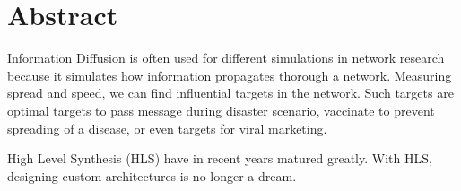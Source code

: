 \section*{Abstract}


Information Diffusion is often used for different simulations in network research because it simulates how information propagates thorough a network. Measuring spread and speed, we can find influential targets in the network. Such targets are optimal targets to pass message during disaster scenario, vaccinate to prevent spreading of a disease, or even targets for viral marketing. 


High Level Synthesis (HLS) have in recent years matured greatly. With HLS, designing custom architectures  is no longer a dream.